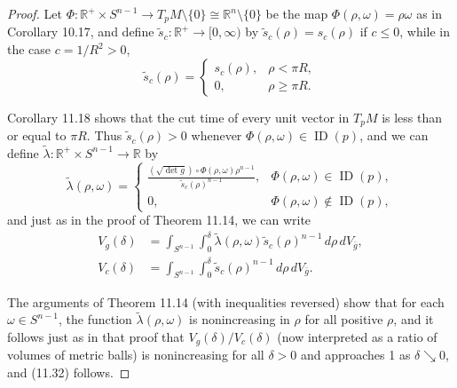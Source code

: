 \begin{theorem}
\begin{proof}
Let $\Phi: \mathbb{R}^+ \times S^{n-1} \to T_pM \setminus \{0\} \cong \mathbb{R}^n \setminus \{0\}$ be the map $\Phi(\rho,\omega) = \rho\omega$ as in
Corollary 10.17, and define $\tilde{s}_c: \mathbb{R}^+ \to [0,\infty)$ by $\tilde{s}_c(\rho) = s_c(\rho)$ if $c \leq 0$, while in
the case $c = 1/R^2 > 0$,
\[
\tilde{s}_c(\rho) = \begin{cases}
s_c(\rho), & \rho < \pi R, \\
0, & \rho \geq \pi R.
\end{cases}
\]

Corollary 11.18 shows that the cut time of every unit vector in $T_p M$ is less than or equal to $\pi R$. Thus $\tilde{s}_c(\rho) > 0$ whenever $\Phi(\rho,\omega) \in \operatorname{ID}(p)$, and we can define $\tilde{\lambda}: \mathbb{R}^+ \times S^{n-1} \to \mathbb{R}$ by
\[
\tilde{\lambda}(\rho,\omega) = \begin{cases}
\frac{(\sqrt{\det g}) \circ \Phi(\rho,\omega)\rho^{n-1}}{\tilde{s}_c(\rho)^{n-1}}, & \Phi(\rho,\omega) \in \operatorname{ID}(p), \\
0, & \Phi(\rho,\omega) \notin \operatorname{ID}(p),
\end{cases}
\]
and just as in the proof of Theorem 11.14, we can write
\begin{align}
V_g(\delta) &= \int_{S^{n-1}} \int_0^\delta \tilde{\lambda}(\rho,\omega)\tilde{s}_c(\rho)^{n-1} \, d\rho \, dV_{\bar{g}}, \\
V_c(\delta) &= \int_{S^{n-1}} \int_0^\delta \tilde{s}_c(\rho)^{n-1} \, d\rho \, dV_{\bar{g}}.
\end{align}

The arguments of Theorem 11.14 (with inequalities reversed) show that for each $\omega \in S^{n-1}$, the function $\tilde{\lambda}(\rho,\omega)$ is nonincreasing in $\rho$ for all positive $\rho$, and it follows just as in that proof that $V_g(\delta)/V_c(\delta)$ (now interpreted as a ratio of volumes of metric balls) is nonincreasing for all $\delta > 0$ and approaches 1 as $\delta \searrow 0$, and (11.32) follows.


\end{proof}
\end{theorem}
